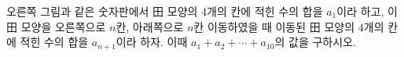 \noindent\begin{minipage}[t]{0.58\linewidth}\vspace{0pt}\raggedright 오른쪽 그림과 같은 숫자판에서 田 모양의 $4$개의 칸에 적힌 수의 합을 $a_1$이라 하고, 이 田 모양을 오른쪽으로 $n$칸, 아래쪽으로 $n$칸 이동하였을 때 이동된 田 모양의 $4$개의 칸에 적힌 수의 합을 $a_{n+1}$이라 하자. 이때 $a_1+a_2+\cdots+a_{10}$의 값을 구하시오.\end{minipage}\hfill\begin{minipage}[t]{0.4\linewidth}\vspace{0pt}\centering \resizebox{\ifdim\width>\linewidth\linewidth\else\width\fi}{!}{}\end{minipage}\par
